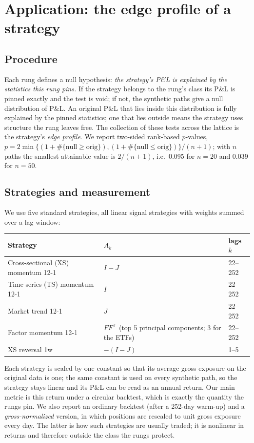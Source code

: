 \documentclass[11pt]{article}
\theoremstyle{definition}
\theoremstyle{remark}
\begin{document}
\section{Application: the edge profile of a strategy}
\label{sec:edge}

\subsection{Procedure}

Each rung defines a null hypothesis: \emph{the strategy's P\&L is explained by the statistics this rung pins.} If the strategy belongs to the rung's class its P\&L is pinned
exactly and the test is void; if not, the synthetic paths give a null distribution of P\&L. An original P\&L that lies inside this distribution is fully explained by the pinned
statistics; one that lies outside means the strategy uses structure the rung leaves free. The collection of these tests across the lattice is the strategy's
\emph{edge profile}. We report two-sided rank-based $p$-values, $p=2\min\{(1+\#\{\text{null}\ge\text{orig}\}),(1+\#\{\text{null}\le\text{orig}\})\}/(n+1)$; with $n$ paths
the smallest attainable value is $2/(n+1)$, i.e.\ 0.095 for $n=20$ and 0.039 for $n=50$.

\subsection{Strategies and measurement}

We use five standard strategies, all linear signal strategies with weights summed over a lag window:
\begin{center}\small
\begin{tabular}{lll}
\toprule
Strategy & $A_k$ & lags $k$ \\
\midrule
Cross-sectional (XS) momentum 12-1 & $I-J$ & 22--252 \\
Time-series (TS) momentum 12-1 & $I$ & 22--252 \\
Market trend 12-1 & $J$ & 22--252 \\
Factor momentum 12-1 & $FF^\top$ (top 5 principal components; 3 for the ETFs) & 22--252 \\
XS reversal 1w & $-(I-J)$ & 1--5 \\
\bottomrule
\end{tabular}
\end{center}
Each strategy is scaled by one constant so that its average gross exposure on the original data is one; the same constant is used on every synthetic path, so the
strategy stays linear and its P\&L can be read as an annual return. Our main metric is this return under a circular backtest, which is exactly the quantity the rungs
pin. We also report an ordinary backtest (after a 252-day warm-up) and a \emph{gross-normalized} version, in which positions are rescaled to unit gross exposure every
day. The latter is how such strategies are usually traded; it is nonlinear in returns and therefore outside the class the rungs protect.
\end{document}
